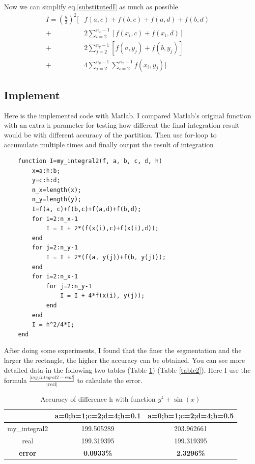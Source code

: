 \documentclass[
	12pt, %
]{fphw}
\numberwithin{equation}{section}
\numberwithin{figure}{section}
\numberwithin{table}{section}
\begin{document}
Now we can simplify eq.\eqref{substitutedI} as much as possible
\begin{equation}
	\begin{aligned}
		I = (\frac{h}{2})^2[ & f(a, c)+f(b, c)+f(a, d)+f(b, d)                   \\
		+                    & 2\sum^{n_x-1}_{i=2}[f(x_i, c)+f(x_i, d)]          \\
		+                    & 2\sum^{n_y-1}_{j=2}[f(a, y_j)+f(b, y_j)]          \\
		+                    & 4\sum^{n_y-1}_{j=2}\sum^{n_x-1}_{i=2}f(x_i, y_j)]
	\end{aligned}
\end{equation}


\subsection*{Implement}

Here is the implemented code with Matlab. I compared Matlab's original function with an extra h parameter for testing how different the final integration result would be with different accuracy of the partition. Then use for-loop to accumulate multiple times and finally output the result of integration

\begin{lstlisting}
	function I=my_integral2(f, a, b, c, d, h)
		x=a:h:b;
		y=c:h:d;
		n_x=length(x);
		n_y=length(y);
		I=f(a, c)+f(b,c)+f(a,d)+f(b,d);
		for i=2:n_x-1
			I = I + 2*(f(x(i),c)+f(x(i),d));
		end
		for j=2:n_y-1
			I = I + 2*(f(a, y(j))+f(b, y(j)));
		end
		for i=2:n_x-1
			for j=2:n_y-1
				I = I + 4*f(x(i), y(j));
			end
		end
		I = h^2/4*I;
	end
\end{lstlisting}

After doing some experiments, I found that the finer the segmentation and the larger the rectangle, the higher the accuracy can be obtained. You can see more detailed data in the following two tables (Table \ref{table1}) (Table \ref{table2}).
Here I use the formula $\frac{\left\lvert my\_integral2-real\right\rvert }{\left\lvert real\right\rvert }$ to calculate the error.

\begin{table}
	\centering
	\caption{Accuracy of difference h with function $y^4+\sin(x)$}
	\label{table1}
	\begin{tabular}{ccc}
		\toprule
		               & a=0;b=1;c=2;d=4;h=0.1 & a=0;b=1;c=2;d=4;h=0.5 \\
		\midrule
		my\_integral2  & 199.505289            & 203.962661            \\
		real           & 199.319395            & 199.319395            \\
		\textbf{error} & \textbf{0.0933\%}     & \textbf{2.3296\%}     \\
		\bottomrule
	\end{tabular}
\end{table}
\end{document}

